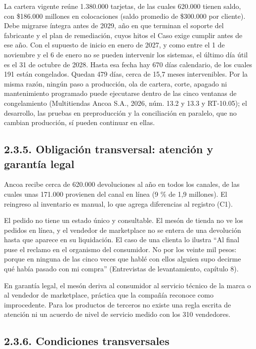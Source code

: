 \documentclass[11pt]{article}
\begin{document}
La cartera vigente reúne 1.380.000 tarjetas, de las cuales 620.000 tienen saldo, con \$186.000 millones en colocaciones (saldo promedio de \$300.000 por cliente). Debe migrarse íntegra antes de 2029, año en que terminan el soporte del fabricante y el plan de remediación, cuyos hitos el Caso exige cumplir antes de ese año. Con el supuesto de inicio en enero de 2027, y como entre el 1 de noviembre y el 6 de enero no se pueden intervenir los sistemas, el último día útil es el 31 de octubre de 2028. Hasta esa fecha hay 670 días calendario, de los cuales 191 están congelados. Quedan 479 días, cerca de 15,7 meses intervenibles. Por la misma razón, ningún paso a producción, ola de cartera, corte, apagado ni mantenimiento programado puede ejecutarse dentro de las cinco ventanas de congelamiento (Multitiendas Ancoa S.A., 2026, núm. 13.2 y 13.3 y RT-10.05); el desarrollo, las pruebas en preproducción y la conciliación en paralelo, que no cambian producción, sí pueden continuar en ellas.

\subsection{2.3.5. Obligación transversal: atención y garantía legal}\label{obligacion-transversal-atencion-y-garantia-legal}

Ancoa recibe cerca de 620.000 devoluciones al año en todos los canales, de las cuales unas 171.000 provienen del canal en línea (9 \% de 1,9 millones). El reingreso al inventario es manual, lo que agrega diferencias al registro (C1).

El pedido no tiene un estado único y consultable. El mesón de tienda no ve los pedidos en línea, y el vendedor de marketplace no se entera de una devolución hasta que aparece en su liquidación. El caso de una clienta lo ilustra ``Al final puse el reclamo en el organismo del consumidor. No por los veinte mil pesos: porque en ninguna de las cinco veces que hablé con ellos alguien supo decirme qué había pasado con mi compra'' (Entrevistas de levantamiento, capítulo 8).

En garantía legal, el mesón deriva al consumidor al servicio técnico de la marca o al vendedor de marketplace, práctica que la compañía reconoce como improcedente. Para los productos de terceros no existe una regla escrita de atención ni un acuerdo de nivel de servicio medido con los 310 vendedores.

\subsection{2.3.6. Condiciones transversales}\label{condiciones-transversales}
\end{document}
